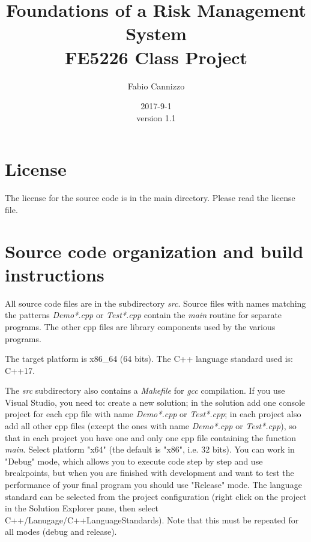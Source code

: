 \documentclass[10pt]{article}
\title{Foundations of a Risk Management System \\
\large FE5226 Class Project
}
\author{Fabio Cannizzo}
\date{2017-9-1\\ version 1.1}
\begin{document}
\maketitle


\section{License}
The license for the source code is in the main directory. Please read the license file.
\section{Source code organization and build instructions}
All source code files are in the subdirectory \textit{src}. Source files with names matching the patterns \textit{Demo*.cpp} or \textit{Test*.cpp} contain the \textit{main} routine for separate programs. The other cpp files are library components used by the various programs.

The target platform is x86\_64 (64 bits). The C++ language standard used is: C++17.

The \textit{src} subdirectory also contains a \textit{Makefile} for \textit{gcc} compilation. If you use Visual Studio, you need to: create a new solution; in the solution add one console project for each cpp file with name \textit{Demo*.cpp} or \textit{Test*.cpp}; in each project also add all other cpp files (except the ones with name \textit{Demo*.cpp} or \textit{Test*.cpp}), so that in each project you have one and only one cpp file containing the function \textit{main}. Select platform "x64" (the default is "x86", i.e. 32 bits). You can work in "Debug" mode, which allows you to execute code step by step and use breakpoints, but when you are finished with development and want to test the performance of your final program you should use "Release" mode. The language standard can be selected from the project configuration (right click on the project in the Solution Explorer pane, then  select C++/Lanugage/C++LanguageStandards). Note that this must be repeated for all modes (debug and release).
\end{document}
